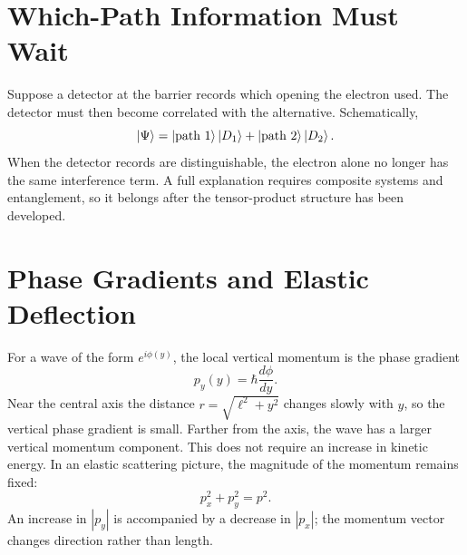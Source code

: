 \section{Which-Path Information Must Wait}

Suppose a detector at the barrier records which opening the electron used.
The detector must then become correlated with the alternative. Schematically,
\begin{equation}
  \left\lvert\Psi\right\rangle
    =\left\lvert\text{path }1\right\rangle\left\lvert D_1\right\rangle
     +\left\lvert\text{path }2\right\rangle\left\lvert D_2\right\rangle.
  \label{eq:path-detector}
\end{equation}
When the detector records are distinguishable, the electron alone no longer
has the same interference term. A full explanation requires composite
systems and entanglement, so it belongs after the tensor-product structure
has been developed.

\begin{classroomqa}
\end{classroomqa}

\section{Phase Gradients and Elastic Deflection}

For a wave of the form \(e^{i\phi(y)}\), the local vertical momentum is the
phase gradient
\begin{equation}
  p_y(y)=\hbar\frac{d\phi}{dy}.
\end{equation}
Near the central axis the distance \(r=\sqrt{\ell^2+y^2}\) changes slowly
with \(y\), so the vertical phase gradient is small. Farther from the axis,
the wave has a larger vertical momentum component. This does not require an
increase in kinetic energy. In an elastic scattering picture, the magnitude
of the momentum remains fixed:
\begin{equation}
  p_x^2+p_y^2=p^2.
\end{equation}
An increase in \(\left|p_y\right|\) is accompanied by a decrease in
\(\left|p_x\right|\); the momentum vector changes direction rather than length.

